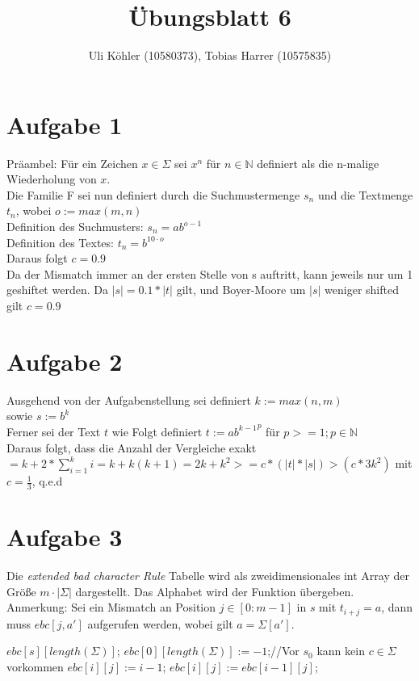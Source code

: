 \documentclass[a4paper,10pt,oneside,leqno]{scrartcl}
\title{Übungsblatt 6}
\author{Uli Köhler (10580373), Tobias Harrer (10575835)}
\begin{document}
\maketitle
\section*{Aufgabe 1}
Präambel: Für ein Zeichen $x \in \Sigma$ sei $x^n$ für $n \in \mathbb{N}$ definiert als die n-malige Wiederholung von $x$.\\
Die Familie F sei nun definiert durch die Suchmustermenge $s_n$ und die Textmenge $t_n$, wobei $o := max(m,n)$	\\
Definition des Suchmusters: $s_n = ab^{o-1}$\\
Definition des Textes: $t_n = b^{10\cdot o}$\\
Daraus folgt $c = 0.9$\\
Da der Mismatch immer an der ersten Stelle von s auftritt, kann jeweils nur um 1 geshiftet werden.
Da $|s| = 0.1*|t|$ gilt, und Boyer-Moore um $|s|$ weniger shifted gilt $c = 0.9$
\section*{Aufgabe 2}
Ausgehend von der Aufgabenstellung sei definiert $k := max(n,m)$\\
sowie $s := b^k$\\
Ferner sei der Text $t$ wie Folgt definiert $t := {ab^{k-1}}^p$ für $p >= 1; p \in \mathbb{N}$\\
Daraus folgt, dass die Anzahl der Vergleiche exakt $ = k + 2 * \sum_{i=1}^{k} i = k+k(k+1)=2k+k^2 >= c * (|t|*|s|) > (c * 3k^2) $ mit $c = \frac{1}{3}$, q.e.d


\section*{Aufgabe 3}%
Die \textit{extended bad character Rule} Tabelle wird als zweidimensionales int Array der Größe $m\cdot |\Sigma|$ dargestellt. Das
Alphabet wird der Funktion übergeben. Anmerkung: Sei ein Mismatch an Position $j\in [0:m-1]$ in $s$ mit
$t_{i+j} = a$, dann muss $ebc[j,a']$ aufgerufen werden, wobei gilt $a=\Sigma[a']$.\newline
\begin{algorithmic}
\State $ebc[s][length(\Sigma)]$;
\State $ebc[0][length(\Sigma)] := -1$;//Vor $s_0$ kann kein $c\in \Sigma$ vorkommen
      \State $ebc[i][j] := i-1$;
    \Else
      \State $ebc[i][j] := ebc[i-1][j]$;
    \EndIf
  \EndFor
\EndFor
\EndFunction
\end{algorithmic}
\end{document}
